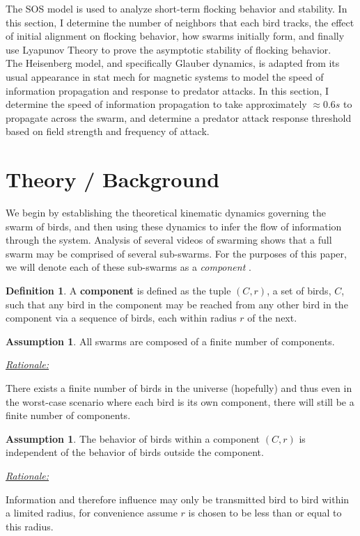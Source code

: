 \documentclass[11pt,a4paper]{article}
\numberwithin{equation}{section}
\theoremstyle{definition}
\newtheorem{definition}[theorem]{Definition}
\theoremstyle{assumption}
\newtheorem{assumption}[theorem]{Assumption}
\newenvironment{rationale}{%
  \par\vspace{0.5em}
  \noindent\hspace{1em}\begin{minipage}{\dimexpr\linewidth-2em}
  \underline{\textit{Rationale:}} 
}{%
  \end{minipage}
  \par\vspace{0.5em}
}
\begin{document}
The SOS model is used to analyze short-term flocking behavior and stability. In this section, I determine the number 
of neighbors that each bird tracks, the effect of initial alignment on flocking behavior, how swarms initially form, 
and finally use Lyapunov Theory to prove the asymptotic stability of flocking behavior. 
\\

The Heisenberg model, and specifically Glauber dynamics, is adapted from its usual appearance in stat mech for magnetic systems to model  
the speed of information propagation and response to predator attacks. In this section, I determine the speed of information propagation 
to take approximately $\approx0.6s$ to propagate across the swarm, and determine a predator attack response threshold based on field strength and frequency of attack.


\section{Theory / Background}
We begin by establishing the theoretical kinematic dynamics governing the swarm of birds, and then using 
these dynamics to infer the flow of information through the system. Analysis of several videos of swarming shows
that a full swarm may be comprised of several sub-swarms. For the purposes of this paper, we will denote each of these 
sub-swarms as a \textit{component} \cite{swarm_video_youtube}.

\begin{definition}
A \textbf{component} is defined as the tuple $(C, r)$, a set of birds, $C$, such that any bird in the component 
may be reached from any other bird in the component via a sequence of birds, each within radius $r$ of the next.
\end{definition}

\begin{assumption}
    All swarms are composed of a finite number of components. 
    \begin{rationale}
        There exists a finite number of birds in the universe (hopefully) and 
        thus even in the worst-case scenario where each bird is its own component, 
        there will still be a finite number of components.
\end{rationale}
\end{assumption}

\begin{assumption}
    The behavior of birds within a component $(C,r)$ is independent of the behavior of birds outside the component.
    \begin{rationale}
        Information and therefore influence may only be transmitted bird 
        to bird within a limited radius, for convenience
        assume $r$ is chosen to be less than or equal to this radius.
    \end{rationale}
\end{assumption}
\end{document}
